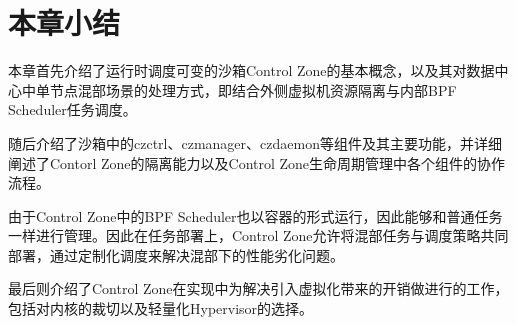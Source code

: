
\section{本章小结}

本章首先介绍了运行时调度可变的沙箱Control Zone的基本概念，以及其对数据中心中单节点混部场景的处理方式，即结合外侧虚拟机资源隔离与内部BPF Scheduler任务调度。

随后介绍了沙箱中的czctrl、czmanager、czdaemon等组件及其主要功能，并详细阐述了Contorl Zone的隔离能力以及Control Zone生命周期管理中各个组件的协作流程。

由于Control Zone中的BPF Scheduler也以容器的形式运行，因此能够和普通任务一样进行管理。因此在任务部署上，Control Zone允许将混部任务与调度策略共同部署，通过定制化调度来解决混部下的性能劣化问题。

最后则介绍了Control Zone在实现中为解决引入虚拟化带来的开销做进行的工作，包括对内核的裁切以及轻量化Hypervisor的选择。